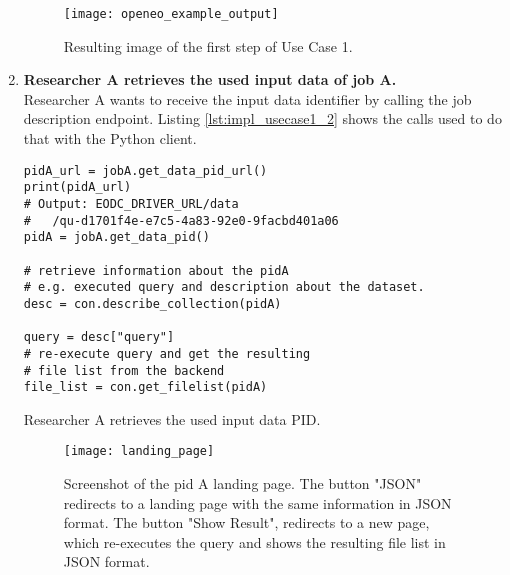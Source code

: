 \documentclass[draft,final]{vutinfth} %
\newenvironment{code}{\captionsetup{type=listing}}{}
\begin{document}
\begin{enumerate}
\begin{figure}[h]
	\centering
	\texttt{[image: openeo\_example\_output]}
	\caption{Resulting image of the first step of Use Case 1.}
	\label{fig:impl_usecase1_min} %
\end{figure}

	\item \textbf{Researcher A retrieves the used input data of job A.} \\
	Researcher A wants to receive the input data identifier by calling the job description endpoint. Listing \ref{lst:impl_usecase1_2} shows the calls used to do that with the Python client.

\begin{code}
	\begin{verbatim}
pidA_url = jobA.get_data_pid_url()
print(pidA_url)
# Output: EODC_DRIVER_URL/data
#	/qu-d1701f4e-e7c5-4a83-92e0-9facbd401a06
pidA = jobA.get_data_pid()

# retrieve information about the pidA 
# e.g. executed query and description about the dataset.
desc = con.describe_collection(pidA)

query = desc["query"]
# re-execute query and get the resulting 
# file list from the backend
file_list = con.get_filelist(pidA)
	\end{verbatim}
	\caption{Researcher A retrieves the used input data PID.}
	\label{lst:impl_usecase1_2}
\end{code}
	
	\begin{figure}[h]
		\centering
		\texttt{[image: landing\_page]}
		\caption{Screenshot of the {pid A} landing page. The button "JSON" redirects to a landing page with the same information in JSON format. The button "Show Result", redirects to a new page, which re-executes the query and shows the resulting file list in JSON format. }
		\label{fig:landing_page} %
	\end{figure}
	

\end{enumerate}
\end{document}
